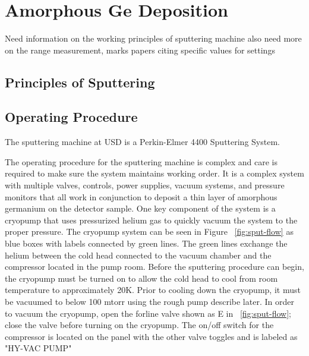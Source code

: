 \section{Amorphous Ge Deposition}

Need information on the working principles of sputtering machine
also need more on the range measurement, marks papers citing specific values for settings 
\subsection{Principles of Sputtering}

\subsection{Operating Procedure}
The sputtering machine at USD is a Perkin-Elmer 4400 Sputtering System.

The operating procedure for the sputtering machine is complex and care is required to make sure the system maintains working order.
It is a complex system with multiple valves, controls, power supplies, vacuum systems, and pressure monitors that all work in conjunction to deposit a thin layer of amorphous germanium on the detector sample.
One key component of the system is a cryopump that uses pressurized helium gas to quickly vacuum the system to the proper pressure.
The cryopump system can be seen in Figure ~\ref{fig:sput-flow} as blue boxes with labels connected by green lines.
The green lines exchange the helium between the cold head connected to the vacuum chamber and the compressor located in the pump room.
Before the sputtering procedure can begin, the cryopump must be turned on to allow the cold head to cool from room temperature to approximately 20K.
Prior to cooling down the cryopump, it must be vacuumed to below 100 mtorr using the rough pump describe later.
In order to vacuum the cryopump, open the forline valve shown as E in ~\ref{fig:sput-flow}; close the valve before turning on the cryopump.
The on/off switch for the compressor is located on the panel with the other valve toggles and is labeled as "HY-VAC PUMP"

